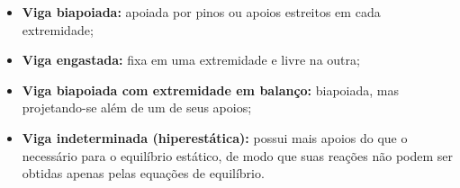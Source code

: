 \documentclass[arial,centeredequations,english,brazilian,oneside,section=TITLE]{ifes8}
\begin{document}
\begin{itemize}
  \item \textbf{Viga biapoiada:} apoiada por pinos ou apoios estreitos em cada
  extremidade;
  \item \textbf{Viga engastada:} fixa em uma extremidade e livre na outra;
  \item \textbf{Viga biapoiada com extremidade em balanço:} biapoiada, mas projetando-se
  além de um de seus apoios;
  \item \textbf{Viga indeterminada (hiperestática):} possui mais apoios do que o
  necessário para o equilíbrio estático, de modo que suas reações não podem ser obtidas
  apenas pelas equações de equilíbrio.
\end{itemize}

\end{document}
